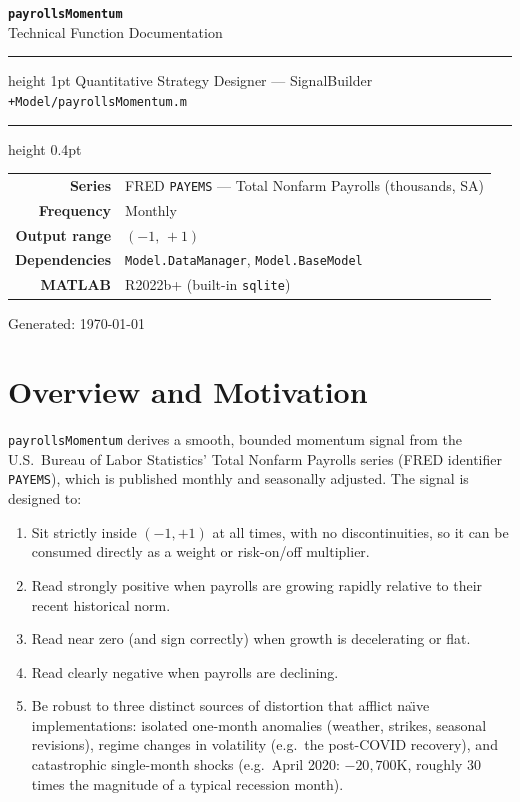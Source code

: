 \documentclass[11pt, a4paper]{article}
\begin{document}
\begin{titlepage}
  \centering
  \vspace*{3cm}
  {\LARGE\bfseries\color{matlabblue} \texttt{payrollsMomentum}}\\[0.6em]
  {\large Technical Function Documentation}\\[2em]
  \hrule height 1pt
  \vspace{1.5em}
  {\large Quantitative Strategy Designer — SignalBuilder}\\[0.4em]
  {\normalsize \texttt{+Model/payrollsMomentum.m}}\\[2em]
  \hrule height 0.4pt
  \vspace{2em}
  {\normalsize
  \begin{tabular}{rl}
    \textbf{Series}       & FRED \texttt{PAYEMS} — Total Nonfarm Payrolls (thousands, SA) \\
    \textbf{Frequency}    & Monthly \\
    \textbf{Output range} & $(-1,\,+1)$ \\
    \textbf{Dependencies} & \texttt{Model.DataManager}, \texttt{Model.BaseModel} \\
    \textbf{MATLAB}       & R2022b+ (built-in \texttt{sqlite}) \\
  \end{tabular}
  }
  \vfill
  {\small\color{gray} Generated: \today}
\end{titlepage}

\tableofcontents
\newpage

\section{Overview and Motivation}
\label{sec:overview}

\texttt{payrollsMomentum} derives a smooth, bounded momentum signal
from the U.S.\ Bureau of Labor Statistics' Total Nonfarm Payrolls
series (FRED identifier \texttt{PAYEMS}), which is published monthly
and seasonally adjusted. The signal is designed to:

\begin{enumerate}[leftmargin=2em]
  \item Sit strictly inside $(-1,+1)$ at all times, with no discontinuities,
        so it can be consumed directly as a weight or risk-on/off multiplier.
  \item Read strongly positive when payrolls are growing rapidly relative
        to their recent historical norm.
  \item Read near zero (and sign correctly) when growth is decelerating
        or flat.
  \item Read clearly negative when payrolls are declining.
  \item Be robust to three distinct sources of distortion that afflict
        na\"{\i}ve implementations: isolated one-month anomalies
        (weather, strikes, seasonal revisions), regime changes in
        volatility (e.g.\ the post-COVID recovery), and catastrophic
        single-month shocks (e.g.\ April 2020: $-20{,}700$K, roughly
        30 times the magnitude of a typical recession month).
\end{enumerate}
\end{document}
